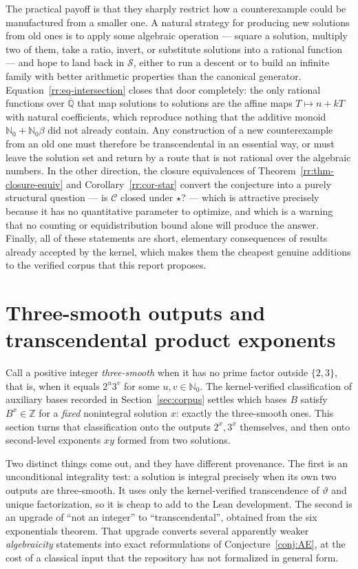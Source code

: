\documentclass[11pt,oneside]{article}
\theoremstyle{definition}
\theoremstyle{remark}
\newcommand{\Nzero}{\mathbb N_0}
\newcommand{\Z}{\mathbb Z}
\newcommand{\Abar}{\overline{\mathbb Q}}
\newcommand{\thetaq}{\vartheta}
\newcommand{\Sol}{\mathcal S}
\newcommand{\Cand}{\mathcal C}
\begin{document}
The practical payoff is that they sharply restrict how a counterexample could be manufactured
from a smaller one.  A natural strategy for producing new solutions from old ones is to apply
some algebraic operation --- square a solution, multiply two of them, take a ratio, invert,
or substitute solutions into a rational function --- and hope to land back in $\Sol$, either
to run a descent or to build an infinite family with better arithmetic properties than the
canonical generator.  Equation~\eqref{rr:eq-intersection} closes that door completely: the
only rational functions over $\Abar$ that map solutions to solutions are the affine maps
$T\mapsto n+kT$ with natural coefficients, which reproduce nothing that the additive monoid
$\Nzero+\Nzero\beta$ did not already contain.  Any construction of a new counterexample from
an old one must therefore be transcendental in an essential way, or must leave the solution
set and return by a route that is not rational over the algebraic numbers.  In the other
direction, the closure equivalences of Theorem~\ref{rr:thm-closure-equiv} and
Corollary~\ref{rr:cor-star} convert the conjecture into a purely structural question --- is
$\Cand$ closed under $\star$? --- which is attractive precisely because it has no
quantitative parameter to optimize, and which is a warning that no counting or
equidistribution bound alone will produce the answer.  Finally, all of these statements are
short, elementary consequences of results already accepted by the kernel, which makes them
the cheapest genuine additions to the verified corpus that this report proposes.

\section{Three-smooth outputs and transcendental product exponents}\label{sec:smooth}

Call a positive integer \emph{three-smooth} when it has no prime factor outside
$\{2,3\}$, that is, when it equals $2^u3^v$ for some $u,v\in\Nzero$.  The kernel-verified
classification of auxiliary bases recorded in Section~\ref{sec:corpus} settles which bases
$B$ satisfy $B^x\in\Z$ for a \emph{fixed} nonintegral solution $x$: exactly the three-smooth
ones.  This section turns that classification onto the outputs $2^x,3^x$ themselves, and
then onto second-level exponents $xy$ formed from two solutions.

Two distinct things come out, and they have different provenance.  The first is an
unconditional integrality test: a solution is integral precisely when its own two outputs
are three-smooth.  It uses only the kernel-verified transcendence of $\thetaq$ and unique
factorization, so it is cheap to add to the Lean development.  The second is an upgrade of
``not an integer'' to ``transcendental'', obtained from the six exponentials theorem.  That
upgrade converts several apparently weaker \emph{algebraicity} statements into exact
reformulations of Conjecture~\ref{conj:AE}, at the cost of a classical input that the
repository has not formalized in general form.
\end{document}
